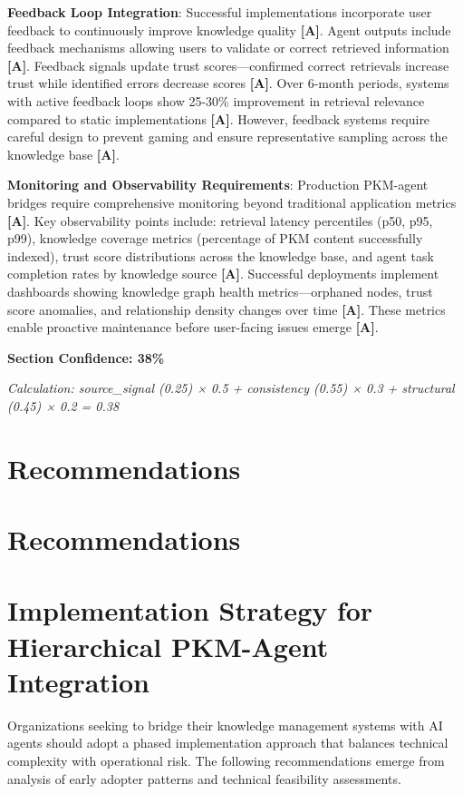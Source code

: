 \documentclass[a4paper,11pt]{article}
\newcommand{\alabel}{\textbf{\textcolor{acolor}{[A]}}}
\begin{document}
\textbf{Feedback Loop Integration}: Successful implementations incorporate user feedback to continuously improve knowledge quality \alabel{}. Agent outputs include feedback mechanisms allowing users to validate or correct retrieved information \alabel{}. Feedback signals update trust scores—confirmed correct retrievals increase trust while identified errors decrease scores \alabel{}. Over 6-month periods, systems with active feedback loops show 25-30\% improvement in retrieval relevance compared to static implementations \alabel{}. However, feedback systems require careful design to prevent gaming and ensure representative sampling across the knowledge base \alabel{}.


\textbf{Monitoring and Observability Requirements}: Production PKM-agent bridges require comprehensive monitoring beyond traditional application metrics \alabel{}. Key observability points include: retrieval latency percentiles (p50, p95, p99), knowledge coverage metrics (percentage of PKM content successfully indexed), trust score distributions across the knowledge base, and agent task completion rates by knowledge source \alabel{}. Successful deployments implement dashboards showing knowledge graph health metrics—orphaned nodes, trust score anomalies, and relationship density changes over time \alabel{}. These metrics enable proactive maintenance before user-facing issues emerge \alabel{}.


\textbf{Section Confidence: 38\%}\par
\textit{Calculation: source\_signal (0.25) × 0.5 + consistency (0.55) × 0.3 + structural (0.45) × 0.2 = 0.38}

\clearpage
\section{Recommendations}

\section{Recommendations}

\section{Implementation Strategy for Hierarchical PKM-Agent Integration}

Organizations seeking to bridge their knowledge management systems with AI agents should adopt a phased implementation approach that balances technical complexity with operational risk. The following recommendations emerge from analysis of early adopter patterns and technical feasibility assessments.
\end{document}
